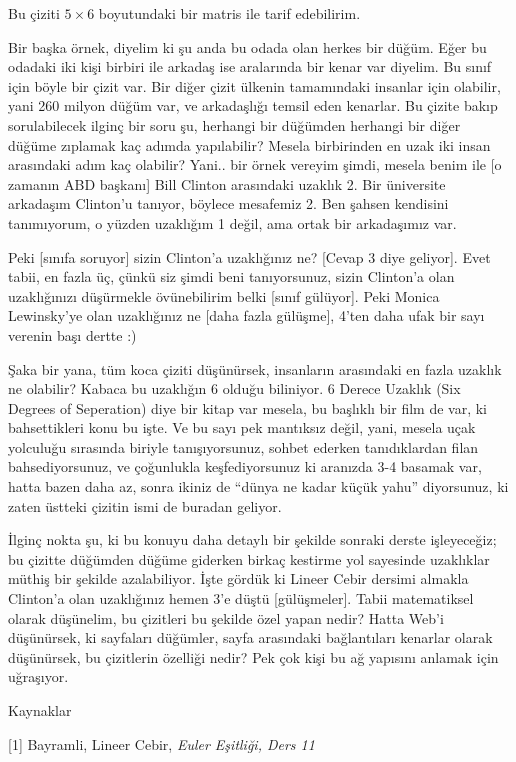 \documentclass[12pt,fleqn]{article}\usepackage{../../common}
\begin{document}
Bu çiziti $5 \times 6$ boyutundaki bir matris ile tarif edebilirim. 

Bir başka örnek, diyelim ki şu anda bu odada olan herkes bir düğüm. Eğer bu
odadaki iki kişi birbiri ile arkadaş ise aralarında bir kenar var
diyelim. Bu sınıf için böyle bir çizit var. Bir diğer çizit ülkenin
tamamındaki insanlar için olabilir, yani 260 milyon düğüm var, ve
arkadaşlığı temsil eden kenarlar. Bu çizite bakıp sorulabilecek ilginç bir
soru şu, herhangi bir düğümden herhangi bir diğer düğüme zıplamak kaç
adımda yapılabilir? Mesela birbirinden en uzak iki insan arasındaki adım
kaç olabilir? Yani.. bir örnek vereyim şimdi, mesela benim ile [o zamanın
ABD başkanı] Bill Clinton arasındaki uzaklık 2. Bir üniversite arkadaşım
Clinton'u tanıyor, böylece mesafemiz 2. Ben şahsen kendisini tanımıyorum,
o yüzden uzaklığım 1 değil, ama ortak bir arkadaşımız var. 

Peki [sınıfa soruyor] sizin Clinton'a uzaklığınız ne? [Cevap 3 diye
geliyor]. Evet tabii, en fazla üç, çünkü siz şimdi beni tanıyorsunuz, sizin
Clinton'a olan uzaklığınızı düşürmekle övünebilirim belki [sınıf
gülüyor]. Peki Monica Lewinsky'ye olan uzaklığınız ne [daha fazla gülüşme],
4'ten daha ufak bir sayı verenin başı dertte :) 

Şaka bir yana, tüm koca çiziti düşünürsek, insanların arasındaki en fazla
uzaklık ne olabilir? Kabaca bu uzaklığın 6 olduğu biliniyor. 6 Derece
Uzaklık (Six Degrees of Seperation) diye bir kitap var mesela, bu başlıklı
bir film de var, ki bahsettikleri konu bu işte. Ve bu sayı pek mantıksız
değil, yani, mesela uçak yolculuğu sırasında biriyle tanışıyorsunuz, sohbet
ederken tanıdıklardan filan bahsediyorsunuz, ve çoğunlukla keşfediyorsunuz
ki aranızda 3-4 basamak var, hatta bazen daha az, sonra ikiniz de ``dünya
ne kadar küçük yahu'' diyorsunuz, ki zaten üstteki çizitin ismi de buradan
geliyor.

İlginç nokta şu, ki bu konuyu daha detaylı bir şekilde sonraki derste
işleyeceğiz; bu çizitte düğümden düğüme giderken birkaç kestirme yol
sayesinde uzaklıklar müthiş bir şekilde azalabiliyor. İşte gördük ki Lineer
Cebir dersimi almakla Clinton'a olan uzaklığınız hemen 3'e düştü
[gülüşmeler]. Tabii matematiksel olarak düşünelim, bu çizitleri bu şekilde
özel yapan nedir? Hatta Web'i düşünürsek, ki sayfaları düğümler, sayfa
arasındaki bağlantıları kenarlar olarak düşünürsek, bu çizitlerin özelliği
nedir? Pek çok kişi bu ağ yapısını anlamak için uğraşıyor. 

Kaynaklar

[1] Bayramli, Lineer Cebir, {\em Euler Eşitliği, Ders 11} 
\end{document}
